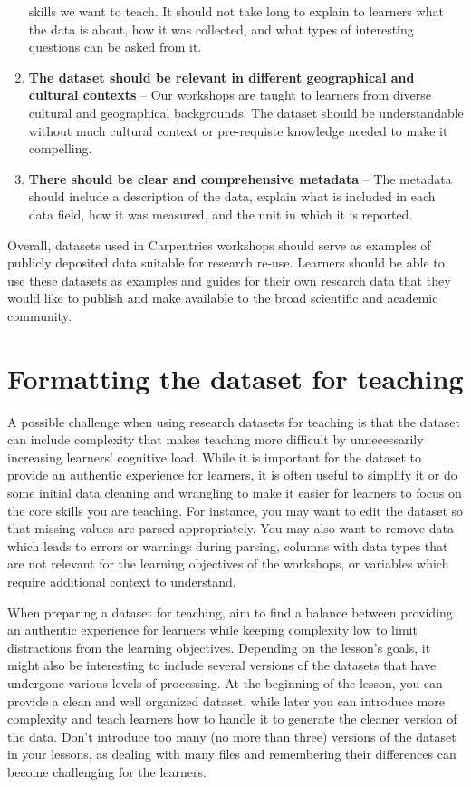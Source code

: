 \documentclass[]{book}
\begin{document}
\begin{enumerate}
  skills we want to teach. It should not take long to explain to learners what the data is about,
  how it was collected, and what types of interesting questions can be asked from it.
\item
  \textbf{The dataset should be relevant in different geographical and cultural contexts} -- Our
  workshops are taught to learners from diverse cultural and geographical backgrounds. The
  dataset should be
  understandable without much cultural context or pre-requiste knowledge needed
  to make it compelling.
\item
  \textbf{There should be clear and comprehensive metadata} -- The metadata should include a
  description of the data, explain what is included in each data field, how it was measured,
  and the unit in which it is reported.
\end{enumerate}

Overall, datasets used in Carpentries workshops should serve as examples of publicly
deposited
data suitable for research re-use. Learners should be able to use these datasets as examples
and guides for their own research data that they would like to publish and make available to
the broad scientific and academic community.

\hypertarget{formatting-the-dataset-for-teaching}{%
\section{Formatting the dataset for teaching}\label{formatting-the-dataset-for-teaching}}

A possible challenge when using research datasets for teaching is that the dataset can
include complexity that makes teaching more difficult by unnecessarily increasing
learners' cognitive load. While it is important for the dataset to
provide an authentic experience for learners, it is often useful to simplify it or
do some initial data cleaning and wrangling to make it easier for learners
to focus on the core skills you are teaching. For instance, you
may want to edit the dataset so that missing values are parsed appropriately.
You may also want to remove data which leads to errors or warnings during parsing,
columns with data types
that are not relevant for the learning objectives of the workshops, or variables which
require additional context to understand.

When preparing a dataset for teaching, aim to find a balance between providing an
authentic experience for learners while keeping complexity low to limit distractions from the
learning objectives. Depending on the lesson's goals, it might also be interesting to
include several versions of the datasets that have undergone various levels of processing.
At the beginning of the lesson, you can provide a clean and well organized dataset, while
later you can introduce more complexity and teach learners how to handle it to generate the cleaner
version of the data. Don't introduce too many (no more than three) versions of the dataset in
your lessons, as dealing with many files and remembering their differences can become
challenging for the learners.
\end{document}
